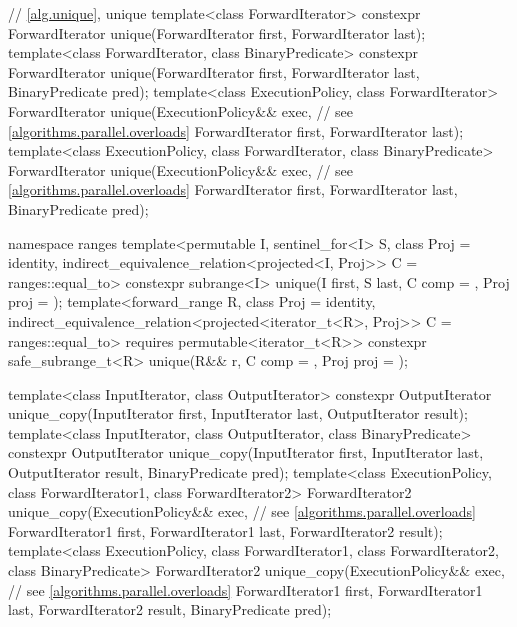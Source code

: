 \begin{codeblock}
{  // \ref{alg.unique}, unique
  template<class ForwardIterator>
    constexpr ForwardIterator unique(ForwardIterator first, ForwardIterator last);
  template<class ForwardIterator, class BinaryPredicate>
    constexpr ForwardIterator unique(ForwardIterator first, ForwardIterator last,
                                     BinaryPredicate pred);
  template<class ExecutionPolicy, class ForwardIterator>
    ForwardIterator unique(ExecutionPolicy&& exec,              // see \ref{algorithms.parallel.overloads}
                           ForwardIterator first, ForwardIterator last);
  template<class ExecutionPolicy, class ForwardIterator, class BinaryPredicate>
    ForwardIterator unique(ExecutionPolicy&& exec,              // see \ref{algorithms.parallel.overloads}
                           ForwardIterator first, ForwardIterator last,
                           BinaryPredicate pred);

  namespace ranges {
    template<permutable I, sentinel_for<I> S, class Proj = identity,
             indirect_equivalence_relation<projected<I, Proj>> C = ranges::equal_to>
      constexpr subrange<I> unique(I first, S last, C comp = {}, Proj proj = {});
    template<forward_range R, class Proj = identity,
             indirect_equivalence_relation<projected<iterator_t<R>, Proj>> C = ranges::equal_to>
      requires permutable<iterator_t<R>>
      constexpr safe_subrange_t<R>
        unique(R&& r, C comp = {}, Proj proj = {});
  }

  template<class InputIterator, class OutputIterator>
    constexpr OutputIterator
      unique_copy(InputIterator first, InputIterator last,
                  OutputIterator result);
  template<class InputIterator, class OutputIterator, class BinaryPredicate>
    constexpr OutputIterator
      unique_copy(InputIterator first, InputIterator last,
                  OutputIterator result, BinaryPredicate pred);
  template<class ExecutionPolicy, class ForwardIterator1, class ForwardIterator2>
    ForwardIterator2
      unique_copy(ExecutionPolicy&& exec,                       // see \ref{algorithms.parallel.overloads}
                  ForwardIterator1 first, ForwardIterator1 last,
                  ForwardIterator2 result);
  template<class ExecutionPolicy, class ForwardIterator1, class ForwardIterator2,
           class BinaryPredicate>
    ForwardIterator2
      unique_copy(ExecutionPolicy&& exec,                       // see \ref{algorithms.parallel.overloads}
                  ForwardIterator1 first, ForwardIterator1 last,
                  ForwardIterator2 result, BinaryPredicate pred);

}
\end{codeblock}
